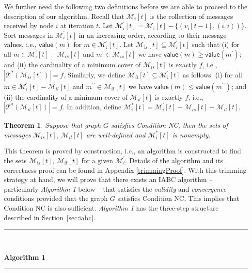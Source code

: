 \documentclass[letterpaper, 11pt]{article}
\newtheorem{theorem}{Theorem}[section]
\newcommand{\calM}{{\mathcal{M}}}
\newcommand{\calT}{{\mathcal{T}}}
\begin{document}
We further need the following two definitions before we are able to proceed to the description of our algorithm. Recall that $\calM_i[t]$ is the collection of messages received by node $i$ at iteration $t$. Let $\calM_i^{\prime}[t]=\calM_i[t]-\{(v_i[t-1], (i,i))\}.$
Sort messages in $\calM_i^{\prime}[t]$ in an increasing order, according to their message values, i.e., $\mathsf{value}(m)$ for $m\in \calM_i^{\prime}[t]$.
Let $\calM_{is}[t]\subseteq \calM_i^{\prime}[t]$ such that
(i) for all $m\in \calM_i^{\prime}[t]-\calM_{is}[t]$ and $m^{\prime}\in \calM_{is}[t]$ we have $\mathsf{value}(m)\ge \mathsf{value}(m^{\prime})$;
and (ii) the cardinality of a minimum cover of $\calM_{is}[t]$ is exactly $f$, i.e., $|\calT^*(\calM_{is}[t])|=f$.
Similarly, we define $\calM_{il}[t]\subseteq \calM_i^{\prime}[t]$ as follows:
(i) for all $m\in \calM_i^{\prime}[t]-\calM_{il}[t]$ and $m^{\prime\prime}\in \calM_{il}[t]$ we have $\mathsf{value}(m)\le\mathsf{value}(m^{\prime\prime})$;
and (ii) the cardinality of a minimum cover of $\calM_{il}[t]$ is exactly $f$, i.e., $|\calT^*(\calM_{il}[t])|=f$.
In addition, define $\calM_{i}^{*}[t]=\calM_i^{\prime}[t]-\calM_{is}[t]-\calM_{il}[t]$.

\begin{theorem}
\label{trimming}
Suppose that graph $G$ satisfies Condition NC, then the sets of messages $\calM_{is}[t]$, $\calM_{il}[t]$ are well-defined and  $\calM_{i}^{*}[t]$ is nonempty.
\end{theorem}
This theorem is proved by construction, i.e., an algorithm is constructed to find the sets $\calM_{is}[t]$, $\calM_{il}[t]$ for a given $\calM_i^{\prime}$. Details of the algorithm and its correctness proof can be found in Appendix \ref{trimmingProof}. With this trimming strategy at hand, 
we will prove that there exists an IABC algorithm -- particularly
{\em Algorithm 1} below -- that satisfies
the {\em validity} and {\em convergence} conditions provided that the
graph $G$ satisfies Condition NC. This implies that Condition NC is also sufficient. {\em Algorithm 1} has the three-step structure described
in Section~\ref{sec:iabc}.







\vspace*{8pt}\hrule
{\,

\bf Algorithm 1}
\vspace*{4pt}\hrule
\end{document}
